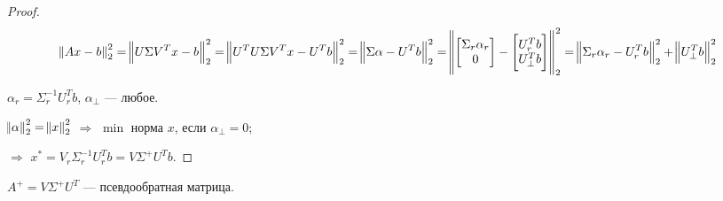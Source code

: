 \begin{proof}
    \[
        \norm{A x - b}_2^2 = \norm{U \Sigma V^T x - b}_2^2
        = \norm{U^T U \Sigma V^T x - U^T b}_2^2
        = \norm{\Sigma \alpha - U^T b}_2^2
        = \norm{\begin{bmatrix} \Sigma_r \alpha_r \\ 0 \end{bmatrix}
            - \begin{bmatrix} U_r^T b \\ U_\perp^T b \end{bmatrix}}_2^2
        = \norm{\Sigma_r \alpha_r - U_r^T b}_2^2 + \norm{U_\perp^T b}_2^2
    \]

    $\alpha_r = \Sigma_r^{-1} U_r^T b$, $\alpha_\perp$ --- любое.

    $\norm{\alpha}_2^2 = \norm{x}_2^2$ $\Rightarrow$ $\min$ норма $x$, если
    $\alpha_\perp = 0$;

    $\Rightarrow$ $x^* = V_r \Sigma_r^{-1} U_r^T b = V \Sigma^+ U^T b$.
\end{proof}

\begin{definition}
    $A^+ = V \Sigma^+ U^T$ --- псевдообратная матрица.
\end{definition}
